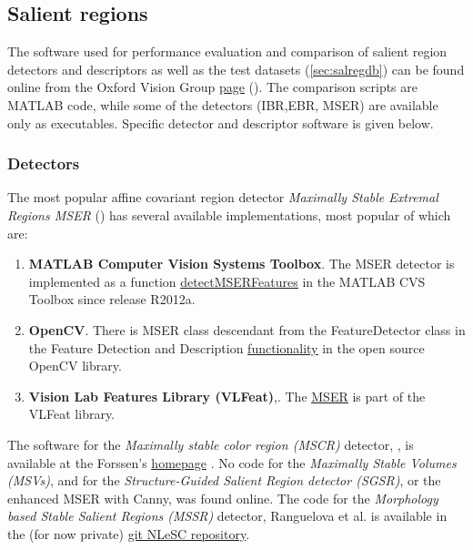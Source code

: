 \subsection{Salient regions}\label{soft:salreg:sec}

{The software used for performance evaluation and comparison of salient region detectors and descriptors \cite{Mikolajczyk:2005} as well as the test datasets (\ref{sec:salregdb}) can be found online from the Oxford Vision Group \href{http://www.robots.ox.ac.uk/~vgg/research/affine/index.html}{\underline{page}} (\cite{vgg_soft_data}). The comparison scripts are MATLAB code, while some of the detectors (IBR,EBR, MSER) are available only as executables. Specific detector and descriptor software is given below.

\subsubsection{Detectors}\label{soft:salregdet:subsec}

The most popular affine covariant region detector {\em Maximally Stable Extremal Regions MSER} (\cite{Matas2002BMVC}) has several available implementations, most popular of which are:
\begin{enumerate}
\item{\bf MATLAB Computer Vision Systems Toolbox}. The MSER detector is implemented as a function \href{http://nl.mathworks.com/help/vision/ref/detectmserfeatures.html}{\underline{\textsf{detectMSERFeatures}}} in the MATLAB CVS Toolbox since release R2012a. 
\item{\bf OpenCV}. There is MSER class descendant from the \textsf{FeatureDetector} class in the Feature Detection and Description \href{http://docs.opencv.org/modules/features2d/doc/feature_detection_and_description.html}{ \underline{functionality}} in the open source OpenCV library.
\item{\bf Vision Lab Features Library (VLFeat)},\cite{vlfeat_soft}. The \href{http://www.vlfeat.org/api/mser.html}{\underline{MSER}} is part of the VLFeat library.
\end{enumerate}
The software for the  {\em Maximally stable color region (MSCR)} detector, \cite{Forssen07}, is available at the Forssen's \href{http://www.cs.ubc.ca/~perfo/mscr/}{\underline{homepage}} \cite{forssen07_soft}.
No code for the {\em Maximally Stable Volumes (MSVs)}, \cite{DonoserB06} and for the {\em Structure-Guided Salient Region detector (SGSR)}, \cite{Fan08} or the enhanced MSER with Canny,\cite{Wang14}  was found online.
The code for the  {\em Morphology based Stable Salient Regions (MSSR) } detector, Ranguelova et al. \cite{RangMSSR06, RangHumpb06} is available in the (for now private) \href{https://github.com/NLeSC/LargeScaleImaging/tree/master/Software}{\underline{git NLeSC repository}}.

}
